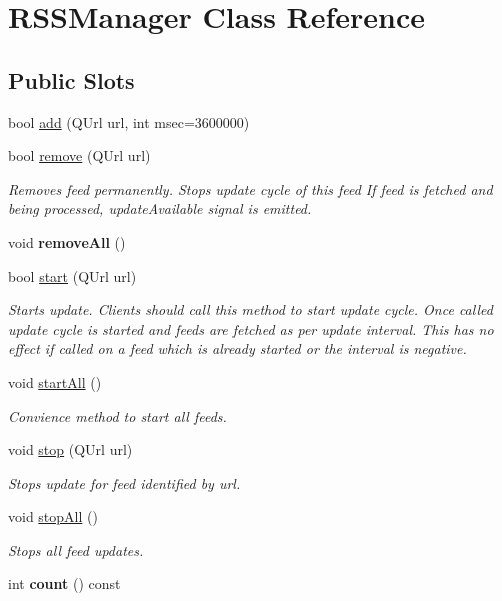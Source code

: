 \hypertarget{class_r_s_s_manager}{\section{R\-S\-S\-Manager Class Reference}
\label{class_r_s_s_manager}
}
\subsection*{Public Slots}
\begin{DoxyCompactItemize}
\item 
bool \hyperlink{class_r_s_s_manager_a1af8b572aadfe48f819a4322b242359c}{add} (Q\-Url url, int msec=3600000)
\item 
bool \hyperlink{class_r_s_s_manager_abe9ccbb2b3df692cf6bc9c781058680e}{remove} (Q\-Url url)
\begin{DoxyCompactList}\small\item\em Removes feed permanently. Stops update cycle of this feed If feed is fetched and being processed, update\-Available signal is emitted. \end{DoxyCompactList}\item 
\hypertarget{class_r_s_s_manager_a14d3f31de276b74e8c97c4eda0ecf68a}{void {\bfseries remove\-All} ()}\label{class_r_s_s_manager_a14d3f31de276b74e8c97c4eda0ecf68a}

\item 
bool \hyperlink{class_r_s_s_manager_a83e1e3050e280ca5018b0bd358b91857}{start} (Q\-Url url)
\begin{DoxyCompactList}\small\item\em Starts update. Clients should call this method to start update cycle. Once called update cycle is started and feeds are fetched as per update interval. This has no effect if called on a feed which is already started or the interval is negative. \end{DoxyCompactList}\item 
void \hyperlink{class_r_s_s_manager_a586bb2f3e73af2ac76a2bfcc73d5c0e5}{start\-All} ()
\begin{DoxyCompactList}\small\item\em Convience method to start all feeds. \end{DoxyCompactList}\item 
void \hyperlink{class_r_s_s_manager_a23a3fbde5eaab58f792087a7129f1840}{stop} (Q\-Url url)
\begin{DoxyCompactList}\small\item\em Stops update for feed identified by {\itshape url\/}. \end{DoxyCompactList}\item 
void \hyperlink{class_r_s_s_manager_a19aa6727d8b9925865a00f515c082c0d}{stop\-All} ()
\begin{DoxyCompactList}\small\item\em Stops all feed updates. \end{DoxyCompactList}\item 
\hypertarget{class_r_s_s_manager_a9906e8f0bf706d6176815e12d1dbe53e}{int {\bfseries count} () const }\label{class_r_s_s_manager_a9906e8f0bf706d6176815e12d1dbe53e}


\end{DoxyCompactItemize}
